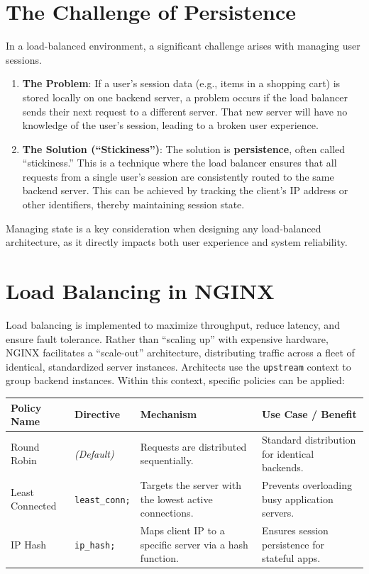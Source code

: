 \documentclass{scrbook}
\begin{document}
	\section{The Challenge of Persistence}
	
	In a load-balanced environment, a significant challenge arises with managing user sessions.
	
	\begin{enumerate}
	    \item \textbf{The Problem}: If a user's session data (e.g., items in a shopping cart) is stored locally on one backend server, a problem occurs if the load balancer sends their next request to a different server. That new server will have no knowledge of the user's session, leading to a broken user experience.
	    \item \textbf{The Solution (``Stickiness'')}: The solution is \textbf{persistence}, often called ``stickiness.'' This is a technique where the load balancer ensures that all requests from a single user's session are consistently routed to the same backend server. This can be achieved by tracking the client's IP address or other identifiers, thereby maintaining session state.
	\end{enumerate}
	
	Managing state is a key consideration when designing any load-balanced architecture, as it directly impacts both user experience and system reliability.
	
	\section{Load Balancing in NGINX}
	
	Load balancing is implemented to maximize throughput, reduce latency, and ensure fault tolerance. Rather than ``scaling up'' with expensive hardware, NGINX facilitates a ``scale-out'' architecture, distributing traffic across a fleet of identical, standardized server instances. Architects use the \texttt{upstream} context to group backend instances. Within this context, specific policies can be applied:
	
	\begin{center}
	\begin{tabularx}{\linewidth}{|p{7.5em}|p{6.5em}|X|X|}
	\hline
	
	\textbf{Policy Name} & \textbf{Directive} & \textbf{Mechanism} & \textbf{Use Case / Benefit} \\
	\hline
	
	Round Robin & \textit{(Default)} & Requests are distributed sequentially. & Standard distribution for identical backends. \\
	\hline
	
	Least Connected & \texttt{least\_conn;} & Targets the server with the lowest active connections. & Prevents overloading busy application servers. \\
	\hline
	
	IP Hash & \texttt{ip\_hash;} & Maps client IP to a specific server via a hash function. & Ensures session persistence for stateful apps. \\
	\hline
	\end{tabularx}
	\end{center}
	
\end{document}
